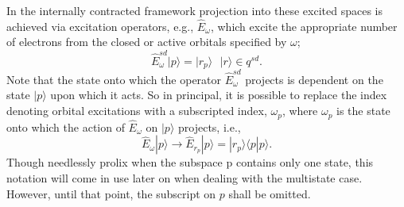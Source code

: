 \noindent In the internally contracted framework projection into these excited spaces is achieved via excitation operators, e.g., $\hat{E}_{\omega}$,
which excite the appropriate number of electrons from the closed or active orbitals specified by $\omega$; 
\begin{equation}
\hat{E}^{sd}_{\omega}|p\rangle = |r_{p}\rangle  \text{ \ \ \ \ } |r\rangle \in q^{sd} .
\end{equation}
Note that the state onto which the operator $\hat{E}^{sd}_{\omega}$ projects is dependent on
the state $|p\rangle $  upon which it acts. So in principal, it is possible to replace the index denoting 
orbital excitations with a subscripted index, $\omega_{p}$, where $\omega_{p}$ is the state onto which
the action of $\hat{E}_{\omega}$ on $|p\rangle$ projects, i.e.,
\begin{equation}
\hat{E}_{\omega} |p\rangle \rightarrow 
\hat{E}_{r_{p}} |p\rangle = | r_{p} \rangle \langle p | p \rangle .
\end{equation}
Though needlessly prolix when the subspace $\mathrm{p}$ contains only one state, this notation will
come in use later on when dealing with the multistate case. However, until that point, the subscript on $p$
shall be omitted.\\

